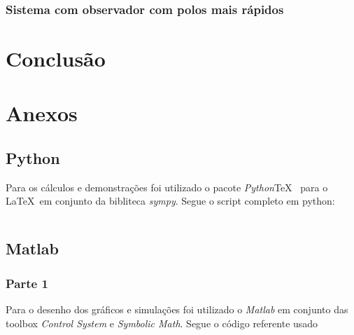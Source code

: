 \documentclass[a4paper,11pt]{article}
\begin{document}
\subsubsection{Sistema com observador com polos mais rápidos}

\section{Conclusão}



\newpage

\nocite{sympy}
\nocite{pythontex}
\nocite{matlabcontrol}
\nocite{matlabsymbolic}
\nocite{ogata2010modern}

\newpage
\section*{Anexos}
\subsection*{Python}

Para os cálculos e demonstrações foi utilizado o pacote \textit{Python}\TeX\ \cite{pythontex} para o \LaTeX\ em conjunto da bibliteca \textit{sympy}\cite{sympy}. Segue o script completo em python:

\inputminted[xleftmargin=15pt,linenos,frame=single,framesep=5pt,breaklines=true]{python}{../python/exsim6.py}

\newpage
\subsection*{Matlab}

\subsubsection*{Parte 1}
Para o desenho dos gráficos e simulações foi utilizado o \textit{Matlab} em conjunto das toolbox \textit{Control System}\cite{matlabcontrol} e \textit{Symbolic Math}\cite{matlabsymbolic}. Segue o código referente usado

\inputminted[xleftmargin=15pt,linenos,frame=single,framesep=5pt,breaklines=true]{matlab}{../matlab/exsim6/exsim6.m}


\end{document}
